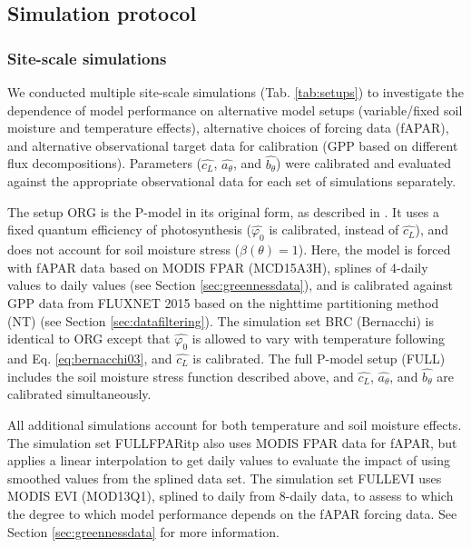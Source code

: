 \documentclass[gmd, manuscript]{copernicus}
\begin{document}
\subsection{Simulation protocol}
\label{sec:protocol}

\subsubsection{Site-scale simulations}

We conducted multiple site-scale simulations (Tab. \ref{tab:setups}) to investigate the dependence of model performance on alternative model setups (variable/fixed soil moisture and temperature effects), alternative choices of forcing data (fAPAR), and alternative observational target data for calibration (GPP based on different flux decompositions). Parameters ($\widehat{c_L}$, $\widehat{a_{\theta}}$, and $\widehat{b_{\theta}}$) were calibrated and evaluated against the appropriate observational data for each set of simulations separately. 

The setup ORG is the P-model in its original form, as described in \citet{wang17natpl}. It uses a fixed quantum efficiency of photosynthesis ($\widehat{\varphi_0}$ is calibrated, instead of $\widehat{c_L}$), and does not account for soil moisture stress ($\beta (\theta)=1$). Here, the model is forced with fAPAR data based on MODIS FPAR (MCD15A3H), splines of 4-daily values to daily values (see Section \ref{sec:greennessdata}), and is calibrated against GPP data from FLUXNET 2015 based on the nighttime partitioning method (NT) (see Section \ref{sec:datafiltering}). The simulation set BRC (Bernacchi) is identical to ORG except that  $\widehat{\varphi_0}$ is allowed to vary with temperature following \citet{bernacchi03pce} and Eq. \ref{eq:bernacchi03}, and $\widehat{c_L}$ is calibrated. The full P-model setup (FULL) includes the soil moisture stress function described above, and $\widehat{c_L}$, $\widehat{a_{\theta}}$, and $\widehat{b_{\theta}}$ are calibrated simultaneously. 

All additional simulations account for both temperature and soil moisture effects. The simulation set FULL\textunderscore FPARitp also uses MODIS FPAR data for fAPAR, but applies a linear interpolation to get daily values to evaluate the impact of using smoothed values from the splined data set. The simulation set FULL\textunderscore EVI uses MODIS EVI (MOD13Q1), splined to daily from 8-daily data, to assess to which the degree to which model performance depends on the fAPAR forcing data. See Section \ref{sec:greennessdata} for more information.
\end{document}
